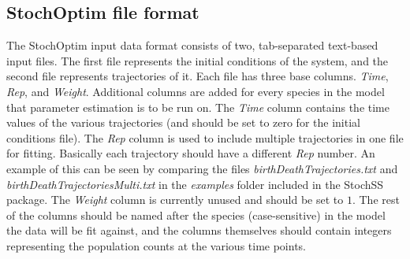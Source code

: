 \subsection{StochOptim file format}
The StochOptim input data format consists of two, tab-separated text-based input files.
The first file represents the initial conditions of the system, and the second file represents trajectories of it.
Each file has three base columns. \textit{Time}, \textit{Rep}, and \textit{Weight}. Additional columns are added for every species in the model that parameter estimation is to be run on. The \textit{Time} column contains the time values of the various trajectories (and should be set to zero for the initial conditions file). The \textit{Rep} column is used to include multiple trajectories in one file for fitting. Basically each trajectory should have a different \textit{Rep} number. An example of this can be seen by comparing the files \textit{birthDeathTrajectories.txt} and \textit{birthDeathTrajectoriesMulti.txt} in the \textit{examples} folder included in the StochSS package. The \textit{Weight} column is currently unused and should be set to $1$. The rest of the columns should be named after the species (case-sensitive) in the model the data will be fit against, and the columns themselves should contain integers representing the population counts at the various time points.


